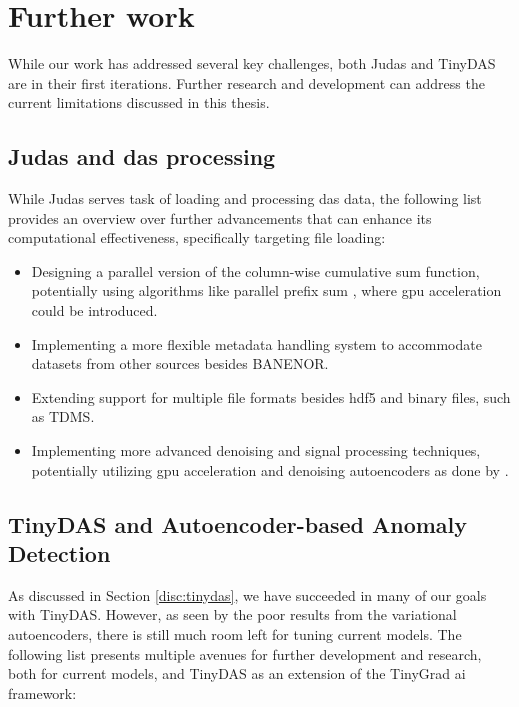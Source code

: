 \section{Further work}
\label{conc:further}

While our work has addressed several key challenges, both Judas and TinyDAS are in their first iterations. Further research and development can address the current limitations discussed in this thesis.

\subsection{Judas and \acrshort{das} processing}

While Judas serves task of loading and processing \acrshort{das} data, the following list provides an overview over further advancements that can enhance its computational effectiveness, specifically targeting file loading:

\begin{itemize}
    \item Designing a parallel version of the column-wise cumulative sum function, potentially using algorithms like parallel prefix sum \cite{harris2007parallel}, where \acrshort{gpu} acceleration could be introduced. 
    \item Implementing a more flexible metadata handling system to accommodate datasets from other sources besides BANENOR.
    \item Extending support for multiple file formats besides \acrshort{hdf5} and binary files, such as TDMS.
    \item Implementing more advanced denoising and signal processing techniques, potentially utilizing \acrshort{gpu} acceleration and denoising autoencoders as done by \cite{denoise}.
\end{itemize}

\subsection{TinyDAS and Autoencoder-based Anomaly Detection}

As discussed in Section \ref{disc:tinydas}, we have succeeded in many of our goals with TinyDAS. However, as seen by the poor results from the variational autoencoders, there is still much room left for tuning current models. The following list presents multiple avenues for further development and research, both for current models, and TinyDAS as an extension of the TinyGrad \acrshort{ai} framework:

